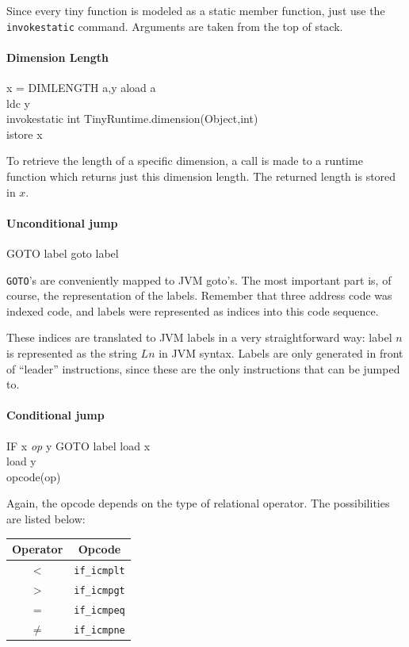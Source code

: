 \documentclass[a4paper]{article}
\begin{document}
Since every tiny function is modeled as a static member function, just use the
\texttt{invokestatic} command. Arguments are taken from the top of stack.

\paragraph{Dimension Length\\}
\translate
{x = DIMLENGTH a,y}
{
aload a\\
ldc y\\
invokestatic int TinyRuntime.dimension(Object,int)\\
istore x
}

To retrieve the length of a specific dimension, a call is made to a runtime
function which returns just this dimension length. The returned length is
stored in $x$.

\paragraph{Unconditional jump\\}
\translate
{GOTO label}
{goto label}

\texttt{GOTO}'s are conveniently mapped to JVM goto's. The most important part
is, of course, the representation of the labels. Remember that three address
code was indexed code, and labels were represented as indices into this code
sequence.

These indices are translated to JVM labels in a very straightforward way:
label $n$ is represented as the string $Ln$ in JVM syntax. Labels are only generated in
front of ``leader'' instructions, since these are the only instructions that
can be jumped to.

\paragraph{Conditional jump\\}
\translate
{IF x \textsl{op} y GOTO label}
{
load x\\
load y\\
opcode(op)
}

Again, the opcode depends on the type of relational operator. The
possibilities are listed below:
\begin{center}
\begin{tabular}{|c|c|}
\hline
Operator & Opcode \\
\hline
$<$ & \texttt{if\_icmplt} \\
$>$ & \texttt{if\_icmpgt} \\
$=$ & \texttt{if\_icmpeq} \\
$\neq$ & \texttt{if\_icmpne} \\
\hline
\end{tabular}
\end{center}
\end{document}
